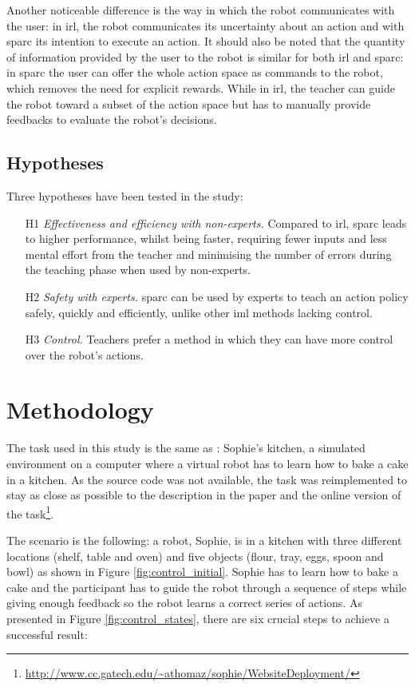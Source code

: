 Another noticeable difference is the way in which the robot communicates with the user: in \gls{irl}, the robot communicates its uncertainty about an action and with \gls{sparc} its intention to execute an action. It should also be noted that the quantity of information provided by the user to the robot is similar for both \gls{irl} and \gls{sparc}: in \gls{sparc} the user can offer the whole action space as commands to the robot, which removes the need for explicit rewards. While in \gls{irl}, the teacher can guide the robot toward a subset of the action space but has to manually provide feedbacks to evaluate the robot's decisions.

\subsection{Hypotheses}

Three hypotheses have been tested in the study:
\begin{enumerate}
	\item [H1] \textit{Effectiveness and efficiency with non-experts.} Compared to \gls{irl}, \gls{sparc} leads to higher performance, whilst being faster, requiring fewer inputs and less mental effort from the teacher and minimising the number of errors during the teaching phase when used by non-experts.
	\item [H2] \textit{Safety with experts.} \gls{sparc} can be used by experts to teach an action policy safely, quickly and efficiently, unlike other \gls{iml} methods lacking control.
	\item [H3] \textit{Control.} Teachers prefer a method in which they can have more control over the robot's actions.
\end{enumerate}
\section{Methodology}

The task used in this study is the same as \cite{thomaz2008teachable}: Sophie's kitchen, a simulated environment on a computer where a virtual robot has to learn how to bake a cake in a kitchen. As the source code was not available, the task was reimplemented to stay as close as possible to the description in the paper and the online version of the task\footnote{\url{http://www.cc.gatech.edu/~athomaz/sophie/WebsiteDeployment/}}.

The scenario is the following: a robot, Sophie, is in a kitchen with three different locations (shelf, table and oven) and five objects (flour, tray, eggs, spoon and bowl) as shown in Figure \ref{fig:control_initial}. Sophie has to learn how to bake a cake and the participant has to guide the robot through a sequence of steps while giving enough feedback so the robot learns a correct series of actions. As presented in Figure \ref{fig:control_states}, there are six crucial steps to achieve a successful result:


